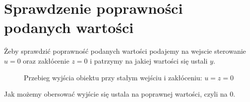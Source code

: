 \chapter{Sprawdzenie poprawności podanych wartości}
Żeby sprawdzić poprawność podanych wartości podajemy na wejscie sterowanie $u = 0$ oraz zakłócenie $z = 0$ i patrzymy na jakiej wartości się ustali $y$.

\begin{figure}[H]
\centering

\caption{Przebieg wyjścia obiektu przy stałym wejściu i zakłóceniu: $u = z = 0$}
\end{figure}

Jak możemy obersować wyjście się ustala na poprawnej wartości, czyli na 0.
